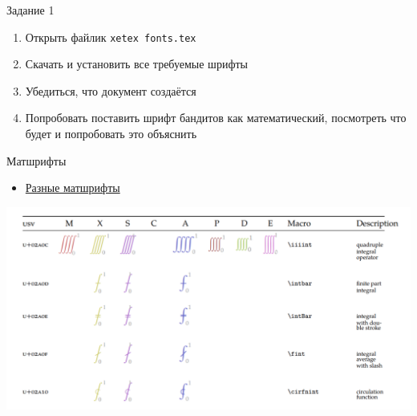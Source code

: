 \documentclass[aspectratio=169]{beamer} %
\begin{document}
\begin{frame}{Задание 1} 
\begin{enumerate}
	\item  Открыть файлик  \texttt{xetex fonts.tex}
	\item  Скачать и установить все требуемые шрифты
	\item  Убедиться, что документ создаётся
	\item  Попробовать поставить шрифт бандитов как математический, посмотреть что будет и попробовать это объяснить
\end{enumerate}
\end{frame}


\begin{frame}[fragile]{Матшрифты}

\begin{itemize}
\item \href{http://ftp.math.purdue.edu/mirrors/ctan.org/macros/latex/contrib/unicode-math/unimath-symbols.pdf}{Разные матшрифты}
\end{itemize}

\begin{center}
\includegraphics[width=0.8\linewidth]{math_fonts.png}
\end{center}	
\end{frame}

{
\begin{frame}
\end{frame}
}
\end{document}
